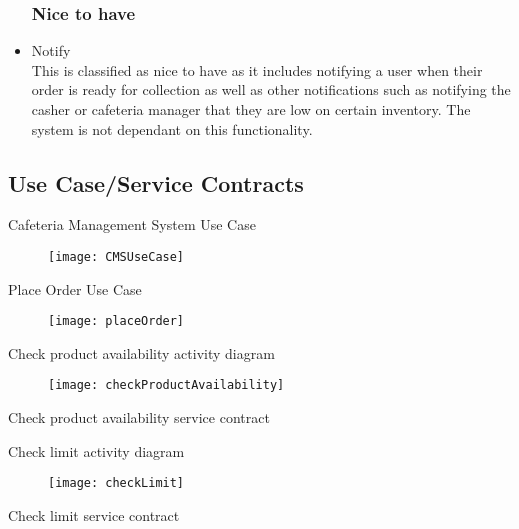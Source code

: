 \documentclass[12pt]{article}
\begin{document}
\begin{itemize}
\subsubsection{Nice to have}
\item Notify \\
This is classified as nice to have as it includes notifying a user when their order is ready for collection as well as other notifications such as notifying the casher or cafeteria manager that they are low on certain inventory.  The system is not dependant on this functionality.

\end{itemize}

\subsection{Use Case/Service Contracts}

\item Cafeteria Management System Use Case\\
\begin{figure}[h!]
  \centering
    \texttt{[image: CMSUseCase]} 
\end{figure}

\item Place Order Use Case\\
\begin{figure}[h!]
  \centering
    \texttt{[image: placeOrder]} 
\end{figure}

\item Check product availability activity diagram\\
\begin{figure}[h!]
  \centering
    \texttt{[image: checkProductAvailability]} 
\end{figure}

\item Check product availability service contract\\

\item Check limit activity diagram\\
\begin{figure}[h!]
  \centering
    \texttt{[image: checkLimit]} 
\end{figure}

\item Check limit service contract \\
\end{document}
